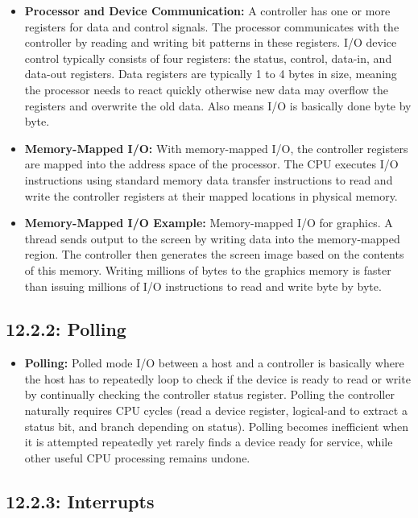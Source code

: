 \documentclass[12pt]{article}
\begin{document}
\begin{itemize}
    \item \textbf{Processor and Device Communication:} A controller has one or more registers for data and control signals. The processor communicates with the controller by reading and writing bit patterns in these registers. I/O device control typically consists of four registers: the status, control, data-in, and data-out registers. Data registers are typically 1 to 4 bytes in size, meaning the processor needs to react quickly otherwise new data may overflow the registers and overwrite the old data. Also means I/O is basically done byte by byte.
    \item \textbf{Memory-Mapped I/O:} With memory-mapped I/O, the controller registers are mapped into the address space of the processor. The CPU executes I/O instructions using standard memory data transfer instructions to read and write the controller registers at their mapped locations in physical memory.
    \item \textbf{Memory-Mapped I/O Example:} Memory-mapped I/O for graphics. A thread sends output to the screen by writing data into the memory-mapped region. The controller then generates the screen image based on the contents of this memory. Writing millions of bytes to the graphics memory is faster than issuing millions of I/O instructions to read and write byte by byte.
\end{itemize}

\subsection*{12.2.2: Polling}

\begin{itemize}
    \item \textbf{Polling:} Polled mode I/O between a host and a controller is basically where the host has to repeatedly loop to check if the device is ready to read or write by continually checking the controller status register. Polling the controller naturally requires CPU cycles (read a device register, logical-and to extract a status bit, and branch depending on status). Polling becomes inefficient when it is attempted repeatedly yet rarely finds a device ready for service, while other useful CPU processing remains undone.
\end{itemize}

\subsection*{12.2.3: Interrupts}
\end{document}
